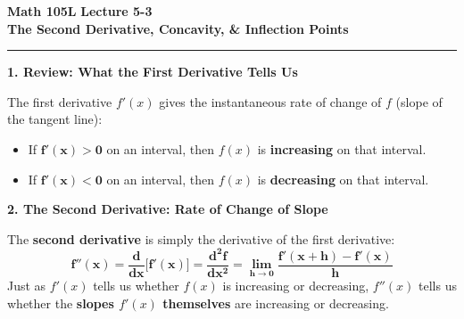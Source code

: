 \documentclass[10.5pt]{article}
\begin{document}
\noindent \textbf{\large Math 105L} \hfill \textbf{\large Lecture 5-3}\\[1pt]
{\textbf{\Large The Second Derivative, Concavity, \& Inflection Points}}\\[-5pt]
\rule{\textwidth}{1.2pt}

\vspace{0.03in}

\textbf{\large 1. Review: What the First Derivative Tells Us}

The first derivative $f'(x)$ gives the instantaneous rate of change of $f$ (slope of the tangent line):
\begin{itemize}[leftmargin=1.2em, topsep=1pt, itemsep=2pt]
  \item If $\mathbf{f'(x) > 0}$ on an interval, then $f(x)$ is \textbf{increasing} on that interval.
  \item If $\mathbf{f'(x) < 0}$ on an interval, then $f(x)$ is \textbf{decreasing} on that interval.
\end{itemize}

\vspace{0.03in}

\textbf{\large 2. The Second Derivative: Rate of Change of Slope}

The \textbf{second derivative} is simply the derivative of the first derivative:
\[
  \mathbf{f''(x) = \frac{d}{dx}\big[f'(x)\big] = \frac{d^2 f}{dx^2} = \lim_{h\to 0}\frac{f'(x+h)-f'(x)}{h}}
\]
Just as $f'(x)$ tells us whether $f(x)$ is increasing or decreasing, $f''(x)$ tells us whether the \textbf{slopes $f'(x)$ themselves} are increasing or decreasing.

\vspace{0.03in}
\end{document}
